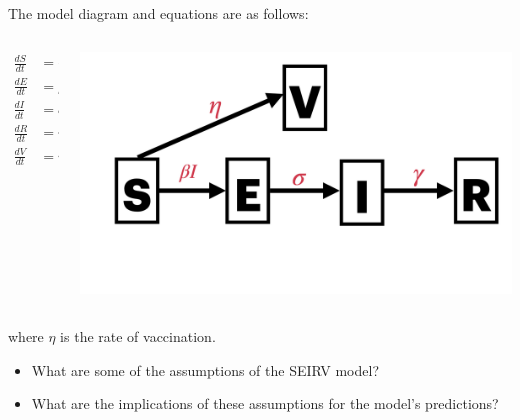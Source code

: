 \documentclass[
  ignorenonframetext,
]{beamer}
\begin{document}
\begin{frame}
The model diagram and equations are as follows:

\begin{columns}[T]
\begin{column}{0.4\textwidth}
\begin{align}
\frac{dS}{dt} & = -\beta S I - \eta S \\
\frac{dE}{dt} & = \beta S I - \sigma E \\
\frac{dI}{dt} & = \sigma E - \gamma I \\
\frac{dR}{dt} & = \gamma I \\
\frac{dV}{dt} & = \eta S
\end{align}
\end{column}

\begin{column}{0.6\textwidth}
\includegraphics{images/model_diagrams/model_diagrams.010.jpeg}
\end{column}
\end{columns}

where \(\eta\) is the rate of vaccination.
\end{frame}

\begin{frame}
\begin{tcolorbox}[enhanced jigsaw, colframe=quarto-callout-caution-color-frame, toprule=.15mm, opacitybacktitle=0.6, breakable, colback=white, leftrule=.75mm, left=2mm, opacityback=0, titlerule=0mm, bottomtitle=1mm, toptitle=1mm, title={Discussion}, bottomrule=.15mm, arc=.35mm, coltitle=black, colbacktitle=quarto-callout-caution-color!10!white, rightrule=.15mm]

\begin{itemize}
\item
  What are some of the assumptions of the SEIRV model?
\item
  What are the implications of these assumptions for the model's
  predictions?
\end{itemize}

\end{tcolorbox}
\end{frame}
\end{document}
